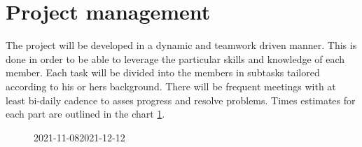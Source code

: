 \documentclass[fleqn,10pt]{SelfArx} %
\begin{document}
\section{Project management}
The project will be developed in a dynamic and teamwork driven manner.
This is done in order to be able to leverage the particular skills and knowledge of each member.
Each task will be divided into the members in subtasks tailored according to his or hers background.
There will be frequent meetings with at least bi-daily cadence to asses progress and resolve problems.
Times estimates for each part are outlined in the chart \ref{gantt}.
\begin{figure}[ht]
	\label{gantt}

	\begin{ganttchart}[
		vgrid,
		title label font = \tiny,
		inline,
		time slot format=isodate,
		x unit=2mm,
		canvas/.style= { fill = green!25, draw =green!50, thick},
		bar/.append style={fill=red!50},
		title/.style={fill=yellow!50}
		]{2021-11-08}{2021-12-12}
		 \\
	\\
	\\
	\\
	\\
	\\
	\\
	\\
	\\
	\end{ganttchart}
\end{figure}




\end{document}
